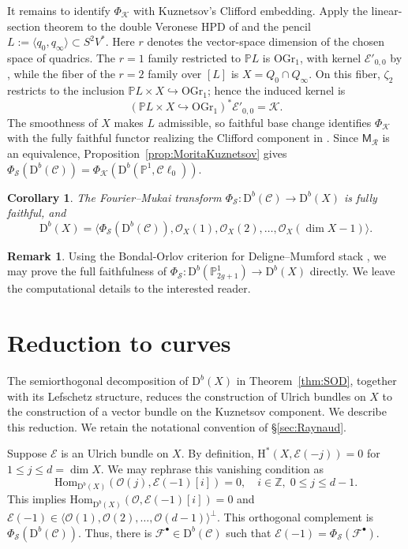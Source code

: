 \documentclass[12pt, letterpaper]{amsart}
\newtheorem{corollary}[theorem]{Corollary}
\theoremstyle{definition}
\newtheorem{remark}[theorem]{Remark}
\newcommand{\PP}{\mathbb{P} }
\newcommand{\ZZ}{\mathbb{Z} }
\newcommand{\cC}{\mathcal{C} }
\newcommand{\cE}{\mathcal{E} }
\newcommand{\cF}{\mathcal{F} }
\newcommand{\cK}{\mathcal{K} }
\newcommand{\cO}{\mathcal{O} }
\newcommand{\cR}{\mathcal{R} }
\newcommand{\cS}{\mathcal{S} }
\newcommand{\rD}{\mathrm{D} }
\newcommand{\rH}{\mathrm{H} }
\def\rHom{\mathrm{Hom} }
\def\OGr{\mathrm{OGr}}
\begin{document}
It remains to identify \(\Phi_{\cK}\) with Kuznetsov's Clifford embedding. Apply the linear-section theorem \cite[Theorem~6.3, \S\S6.1, 6.4]{Kuz07} to the double Veronese HPD of \cite[Theorem~5.4]{Kuz08} and the pencil \(L:=\langle q_0,q_\infty\rangle\subset S^2V^*\). Here \(r\) denotes the vector-space dimension of the chosen space of quadrics. The \(r=1\) family restricted to \(\PP L\) is \(\OGr_1\), with kernel \(\cE'_{0,0}\) by \cite[Lemma~4.5, Remark~4.8]{Kuz08}, while the fiber of the \(r=2\) family over \([L]\) is \(X=Q_0\cap Q_\infty\). On this fiber, \(\zeta_2\) restricts to the inclusion \(\PP L\times X\hookrightarrow\OGr_1\); hence the induced kernel is
\[(\PP L\times X\hookrightarrow\OGr_1)^*\cE'_{0,0}=\cK.\]
The smoothness of \(X\) makes \(L\) admissible, so faithful base change identifies \(\Phi_{\cK}\) with the fully faithful functor realizing the Clifford component in \cite[Theorem~5.5]{Kuz08}. Since \(\mathsf M_{\cR}\) is an equivalence, Proposition~\ref{prop:MoritaKuznetsov} gives \(\Phi_{\cS}(\rD^b(\cC))=\Phi_{\cK}(\rD^b(\PP^1,\cC\ell_0))\).

\begin{corollary}\label{cor:FMfullyfaithful}
The Fourier--Mukai transform \(\Phi_{\cS}:\rD^b(\cC)\to\rD^b(X)\) is fully faithful, and
\[\rD^b(X)=\langle\Phi_{\cS}(\rD^b(\cC)),\cO_X(1),\cO_X(2),\dots,\cO_X(\dim X-1)\rangle.\]
\end{corollary}

\begin{remark}
Using the Bondal-Orlov criterion for Deligne--Mumford stack \cite{LP21}, we may prove the full faithfulness of \(\Phi_{\cS} : \rD^b(\PP_{2g+1}^1) \to \rD^b(X)\) directly. We leave the computational details to the interested reader.
\end{remark}

\section{Reduction to curves}\label{sec:reduction}

The semiorthogonal decomposition of \(\rD^b(X)\) in Theorem~\ref{thm:SOD}, together with its Lefschetz structure, reduces the construction of Ulrich bundles on \(X\) to the construction of a vector bundle on the Kuznetsov component. We describe this reduction. We retain the notational convention of \S\ref{sec:Raynaud}.

Suppose \(\cE\) is an Ulrich bundle on \(X\). By definition, \(\rH^*(X, \cE(-j)) = 0\) for \(1 \le j \le d = \dim X\). We may rephrase this vanishing condition as
\begin{equation}\label{eqn:Ulrichcondition}
\rHom_{\rD^b(X)}(\cO(j), \cE(-1)[i]) = 0, \quad i \in \ZZ, \; 0 \le j \le d - 1.
\end{equation}
This implies \(\rHom_{\rD^b(X)}(\cO, \cE(-1)[i]) = 0\) and \(\cE(-1) \in \langle \cO(1), \cO(2), \dots, \cO(d - 1)\rangle^\perp\). This orthogonal complement is \(\Phi_{\cS}(\rD^b(\cC))\). Thus, there is \(\cF^\bullet \in \rD^b(\cC)\) such that \(\cE(-1) = \Phi_{\cS}(\cF^\bullet)\).
\end{document}
